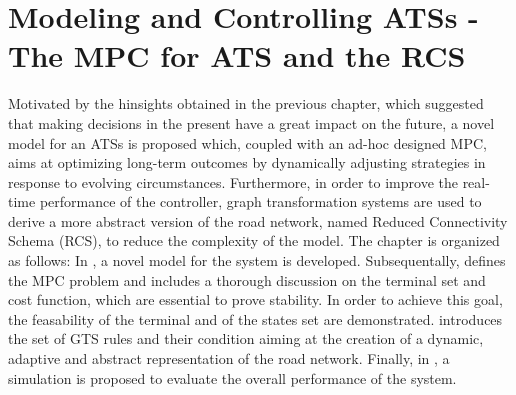 \chapter{Modeling and Controlling ATSs - The MPC for ATS and the RCS}\label{ch:mpc}
Motivated by the hinsights obtained in the previous chapter, which suggested that making decisions in the present have a great impact on the future, a novel model for an ATSs is proposed which, coupled with an ad-hoc designed MPC, aims at optimizing long-term outcomes by dynamically adjusting strategies in response to evolving circumstances. Furthermore, in order to improve the real-time performance of the controller, graph transformation systems are used to derive a more abstract version of the road network, named Reduced Connectivity Schema (RCS), to reduce the complexity of the model. The chapter is organized as follows:
 In , a novel model for the system is developed. Subsequentally,  defines the MPC problem and includes a thorough discussion on the terminal set and cost function, which are essential to prove stability. In order to achieve this goal, the feasability of the terminal and of the states set are demonstrated.  introduces the set of GTS rules and their condition aiming at the creation of a dynamic, adaptive and abstract representation of the road network. Finally, in , a simulation is proposed to evaluate the overall performance of the system. 
